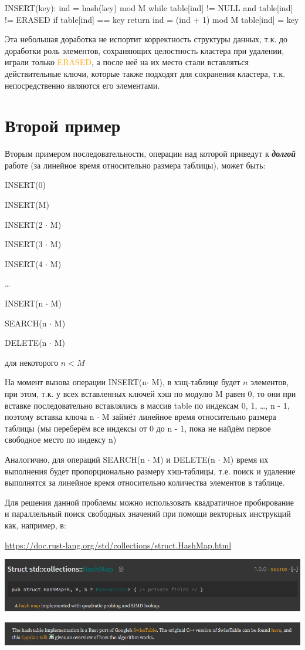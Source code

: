 \documentclass{report}
\begin{document}
\begin{cppcode}
INSERT(key):
    ind = hash(key) mod M
    while table[ind] != NULL and table[ind] != ERASED
        if table[ind] == key
            return
        ind = (ind + 1) mod M
    table[ind] = key
\end{cppcode}

Эта небольшая доработка не испортит корректность структуры данных, т.к. 
до доработки роль элементов, сохраняющих целостность кластера при удалении, 
играли только \textcolor{orange}{ERASED}, а после неё на их место стали
вставляться действительные ключи, которые также подходят для сохранения
кластера, т.к. непосредственно являются его элементами.

\section*{Второй пример}

Вторым примером последовательности, операции над которой приведут к \textbf{\textit{долгой}} 
работе (за линейное время относительно размера таблицы), может быть:

INSERT(0)

INSERT(M)

INSERT(2 $\cdot$ M)

INSERT(3 $\cdot$ M)

INSERT(4 $\cdot$ M)

\dots

INSERT(n $\cdot$ M)

SEARCH(n $\cdot$ M)

DELETE(n $\cdot$ M)

для некоторого $ n < M $

На момент вызова операции INSERT(n$\cdot$ M), в хэщ-таблице будет $n$ элементов,
при этом, т.к. у всех вставленных ключей хэш по модулю M равен 0, то они при вставке 
последовательно вставлялись в массив table по индексам 0, 1, \dots, n - 1, поэтому 
вставка ключа n $\cdot$ M займёт линейное время относительно размера таблицы 
(мы переберём все индексы от 0 до n - 1, пока не найдём первое свободное место по индексу n)

Аналогично, для операций SEARCH(n $\cdot$ M) и DELETE(n $\cdot$ M) время их выполнения 
будет пропорционально размеру хэш-таблицы, т.е. поиск и удаление выполнятся за линейное 
время относительно количества элементов в таблице.

Для решения данной проблемы можно использовать квадратичное пробирование 
и параллельный поиск свободных значений при помощи векторных инструкций
как, например, в:

\url{https://doc.rust-lang.org/std/collections/struct.HashMap.html}

\includegraphics[scale=0.60]{img1.png}

\includegraphics[scale=0.60]{img2.png}
\end{document}
